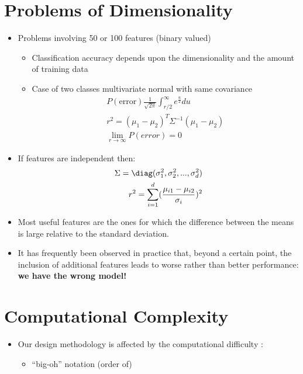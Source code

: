 \section{Problems of Dimensionality} %
\cite[11]{slidesChapter3Part2}
\begin{itemize}
	\item  Problems involving 50 or 100 features (binary valued)
	\begin{itemize}
		\item Classification accuracy depends upon the dimensionality and the amount of training data
		\item Case of two classes multivariate normal with same covariance
		\begin{eqnarray}
		P(\textrm{error}) \frac{1}{\sqrt{2\pi}} \int _{r/2}^{\infty} e^{\frac{u}{2}} du \\
		r^2 = (\mu _1 - \mu_2)^T \Sigma^{-1} (\mu _1 - \mu_2) \\
		\lim _{r \to \infty} P(error) = 0 
		\end{eqnarray}
	\end{itemize}
	\item If features are independent then:  
	\begin{eqnarray}
		\Sigma = \diag ( \sigma_1 ^2, \sigma_2^2 , ..., \sigma_d ^2) \\
		r^2 = \sum _{i=1}^d (\frac{\mu _{i1} - \mu_{i2}}{\sigma_i})^2
	\end{eqnarray}
	\item Most useful features are the ones for which the difference between the means is large relative to the standard deviation.
	\item It has frequently been observed in practice that, beyond a certain point, the inclusion of additional features leads to worse rather than better performance:  \textbf{we have the wrong model!}
	
\end{itemize}

\section{Computational Complexity}

\begin{itemize}
	\item Our design methodology is affected by the computational difficulty : 
	\begin{itemize}
		\item ``big-oh'' notation (order of)
	\end{itemize}
	
\end{itemize}

